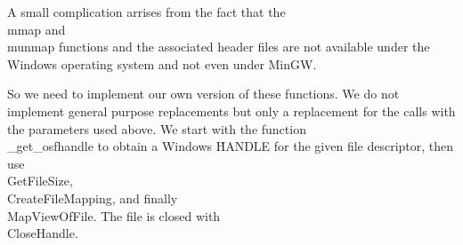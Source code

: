 A small complication arrises from the fact that the \\{mmap} and
\\{munmap} functions and the associated header files are not available
under the Windows operating system and not even under MinGW.

So we need to implement our own version of these functions.  We do not
implement general purpose replacements but only a replacement for the
calls with the parameters used above.  We start with the function
\\{\_get\_osfhandle} to obtain a Windows \.{HANDLE} for the given file
descriptor, then use \\{GetFileSize}, \\{CreateFileMapping}, and finally
\\{MapViewOfFile}.  The file is closed with \\{CloseHandle}.



